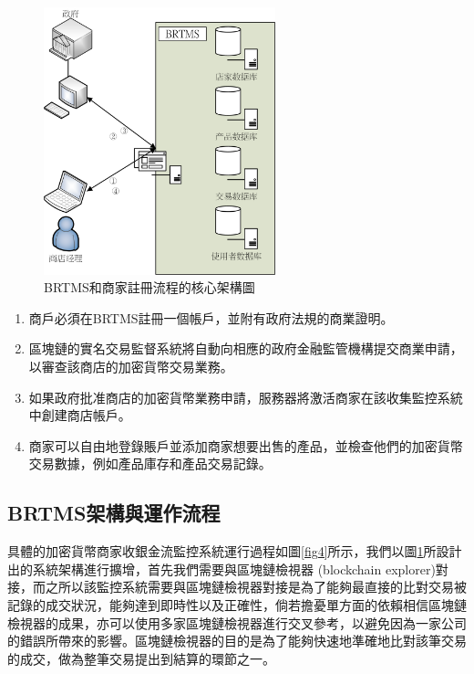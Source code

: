 	\begin{figure}[htbp]
		\centering
		\includegraphics[width = 0.6\textwidth]{fig3.png}
		\caption{BRTMS和商家註冊流程的核心架構圖}\label{fig3}
	\end{figure}

	\begin{enumerate}
		\item 商戶必須在BRTMS註冊一個帳戶，並附有政府法規的商業證明。
		\item 區塊鏈的實名交易監督系統將自動向相應的政府金融監管機構提交商業申請，以審查該商店的加密貨幣交易業務。
		\item 如果政府批准商店的加密貨幣業務申請，服務器將激活商家在該收集監控系統中創建商店帳戶。
		\item 商家可以自由地登錄賬戶並添加商家想要出售的產品，並檢查他們的加密貨幣交易數據，例如產品庫存和產品交易記錄。
	\end{enumerate}

	\subsection{BRTMS架構與運作流程}
	具體的加密貨幣商家收銀金流監控系統運行過程如圖\ref{fig4}所示，我們以圖\ref{fig3}所設計出的系統架構進行擴增，首先我們需要與區塊鏈檢視器 (blockchain explorer)對接，而之所以該監控系統需要與區塊鏈檢視器對接是為了能夠最直接的比對交易被記錄的成交狀況，能夠達到即時性以及正確性，倘若擔憂單方面的依賴相信區塊鏈檢視器的成果，亦可以使用多家區塊鏈檢視器進行交叉參考，以避免因為一家公司的錯誤所帶來的影響。區塊鏈檢視器的目的是為了能夠快速地準確地比對該筆交易的成交，做為整筆交易提出到結算的環節之一。

